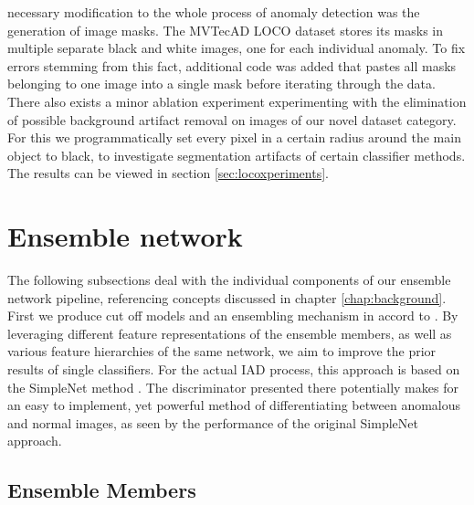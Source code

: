 necessary modification to the whole process of anomaly detection was the generation of image masks. The MVTecAD LOCO dataset stores its 
masks in multiple separate black and white images, one for each individual anomaly. To fix errors stemming from this fact, additional 
code was added that pastes all masks belonging to one image into a single mask before iterating through the data. 
There also exists a minor ablation experiment experimenting with the elimination 
of possible background artifact removal on images of our novel dataset category. For this we programmatically set every pixel in a certain radius around the main object to black, to investigate 
segmentation artifacts of certain classifier methods. The results can be viewed in section \ref{sec:locoxperiments}.




\section{Ensemble network}
\label{sec:ourensemblenetwork}


The following subsections deal with the individual components of our ensemble network pipeline, referencing concepts discussed in chapter \ref{chap:background}. First we produce cut off models 
and an ensembling mechanism in accord to \cite{EnsembleHeller2023}. By leveraging different feature representations of the ensemble 
members, as well as various feature hierarchies of the same network, we aim to improve the prior results of single classifiers.\newline 
For the actual IAD process, this approach is based on the SimpleNet method \cite{liu2023simplenet}. 
The discriminator presented there potentially makes for an easy to implement, yet powerful method of differentiating between anomalous and normal images, as seen by the performance of the original 
SimpleNet approach. 


\subsection{Ensemble Members}
\label{sec:ensemblecandidates}

